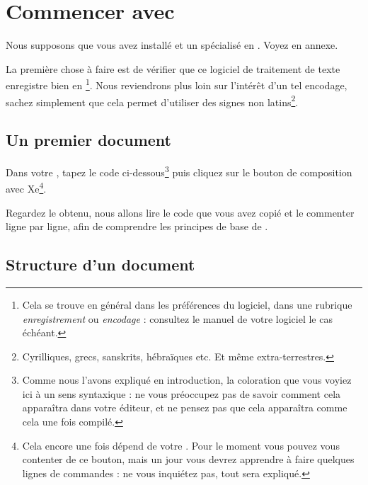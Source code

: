 \chapter{Commencer avec \logiciel{\LaTex}}

\begin{prealable}
Nous supposons que vous avez installé \LaTex et un  spécialisé en \logiciel{\LaTex}. Voyez en annexe.

La première chose à faire est de vérifier que ce logiciel de traitement de texte enregistre bien en \footnote{Cela se trouve en général dans les préférences du logiciel, dans une rubrique \emph{enregistrement} ou \emph{encodage} : consultez le manuel de votre logiciel le cas échéant.}. Nous reviendrons plus loin sur l'intérêt d'un tel encodage, sachez simplement que cela permet d'utiliser des signes non latins\footnote{Cyrilliques, grecs, sanskrits, hébraïques etc. Et même extra-terrestres.}.

\end{prealable}

\section{Un premier document}

Dans votre , tapez le code ci-dessous\footnote{Comme nous l'avons expliqué en introduction, la coloration que vous voyiez ici à un sens syntaxique : ne vous préoccupez pas de savoir comment cela apparaîtra dans votre éditeur, et ne pensez pas que cela apparaîtra comme cela une fois compilé.} puis cliquez sur le bouton de composition avec Xe\LaTex\footnote{Cela encore une fois dépend de votre . Pour le moment vous pouvez vous contenter de ce bouton, mais un jour vous devrez apprendre à faire quelques lignes de commandes : ne vous inquiétez pas, tout sera expliqué.}.


Regardez le  obtenu, nous allons lire le code que vous avez copié et le commenter ligne par ligne, afin de comprendre les principes de base de \logiciel{\LaTex}.
\FloatBarrier

\section{Structure d'un document \logiciel{\LaTex}}

